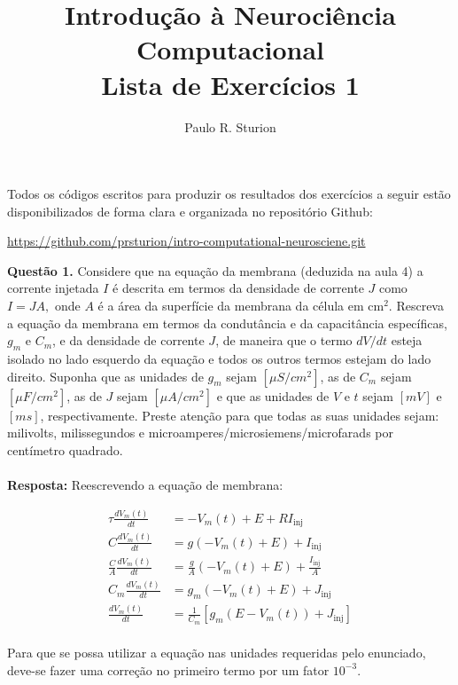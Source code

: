 \documentclass[portuguese,12pt,a4paper]{article}
\title{Introdução à Neurociência Computacional\\Lista de Exercícios 1}
\author{Paulo R. Sturion}
\begin{document}
	\maketitle
	
	\noindent Todos os códigos escritos para produzir os resultados dos exercícios a seguir estão disponibilizados de forma clara e organizada no repositório Github: 
	
	\begin{center}
	\noindent \href{https://github.com/prsturion/intro-computational-neurosciene.git}{https://github.com/prsturion/intro-computational-neurosciene.git} \newline
	\end{center}

	\noindent\textbf{Questão 1.} Considere que na equação da membrana (deduzida na aula 4) a corrente injetada 
	$I$ é descrita em termos da densidade de corrente $J$ como 
	$I = JA,$
	onde $A$ é a área da superfície da membrana da célula em cm$^2$. 
	Rescreva a equação da membrana em termos da condutância e da capacitância específicas, $g_m$ e $C_m$, 
	e da densidade de corrente $J$, de maneira que o termo $dV/dt$ esteja isolado no lado esquerdo da equação 
	e todos os outros termos estejam do lado direito. Suponha que as unidades de $g_m$ sejam $[\mu S/cm^2]$, as de $C_m$ sejam $[\mu F/cm^2]$, 
	as de $J$ sejam $[\mu A/cm^2]$ e que as unidades de $V$ e $t$ sejam $[mV]$ e $[ms]$, respectivamente. 
	Preste atenção para que todas as suas unidades sejam: milivolts, milissegundos e microamperes/microsiemens/microfarads 
	por centímetro quadrado.
	\\\\
	
	\noindent\textbf{Resposta:} Reescrevendo a equação de membrana:
	
	\begin{align*}
		\tau \frac{dV_m(t)}{dt} &= -V_m(t) + E + R I_{\text{inj}} \\
		C \frac{dV_m(t)}{dt} &= g(-V_m(t) + E) + I_{\text{inj}} \\
		\frac{C}{A} \frac{dV_m(t)}{dt} &= \frac{g}{A}(-V_m(t) + E) + \frac{I_{\text{inj}}}{A} \\
		C_m \frac{dV_m(t)}{dt} &= g_m(-V_m(t) + E) + J_{\text{inj}} \\
		\frac{dV_m(t)}{dt} &= \frac{1}{C_m}[g_m(E - V_m(t)) + J_{\text{inj}}]
	\end{align*}\\
	
	Para que se possa  utilizar a equação nas unidades requeridas pelo enunciado, deve-se fazer uma correção no primeiro termo por um fator $10^{-3}$.
	
\end{document}
